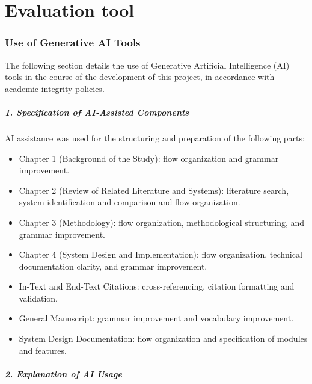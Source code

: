 
\chapter{Evaluation tool}

\subsection*{Use of Generative AI Tools}

\hspace*{\parindent} The following section details the use of Generative Artificial Intelligence (AI) tools in the course of the development of this project, in accordance with academic integrity policies.

\paragraph{1. Specification of AI-Assisted Components}\hspace*{\parindent} 

\hspace*{\parindent} AI assistance was used for the structuring and preparation of the following parts:
\begin{itemize}
    \item Chapter 1 (Background of the Study): flow organization and grammar improvement.
    \item Chapter 2 (Review of Related Literature and Systems): literature search, system identification and comparison and flow organization.
    \item Chapter 3 (Methodology): flow organization, methodological structuring, and grammar improvement.
    \item Chapter 4 (System Design and Implementation): flow organization, technical documentation clarity, and grammar improvement.
    \item In-Text and End-Text Citations: cross-referencing, citation formatting and validation.
    \item General Manuscript: grammar improvement and vocabulary improvement.
    \item System Design Documentation: flow organization and specification of modules and features.
\end{itemize}

\paragraph{2. Explanation of AI Usage}\hspace*{\parindent} 


